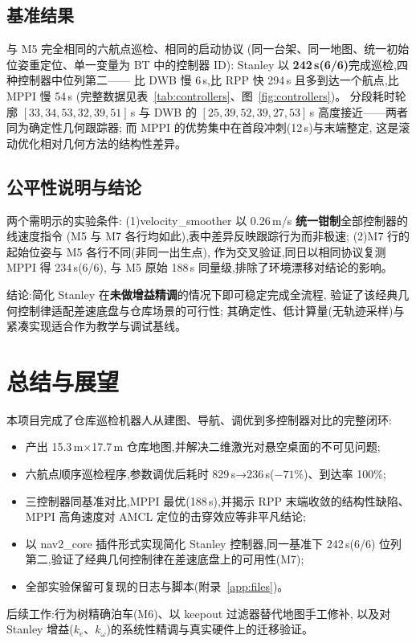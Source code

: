 \documentclass[12pt, a4paper]{ctexart}
\begin{document}
\subsection{基准结果}
与 M5 完全相同的六航点巡检、相同的启动协议
(同一台架、同一地图、统一初始位姿重定位、单一变量为 BT 中的控制器 ID):
Stanley 以 \textbf{242\,s(6/6)}完成巡检,四种控制器中位列第二——
比 DWB 慢 6\,s,比 RPP 快 294\,s 且多到达一个航点,比 MPPI 慢 54\,s
(完整数据见表~\ref{tab:controllers}、图~\ref{fig:controllers})。
分段耗时轮廓 $[33,34,53,32,39,51]$\,s 与 DWB 的 $[25,39,52,39,27,53]$\,s
高度接近——两者同为确定性几何跟踪器;
而 MPPI 的优势集中在首段冲刺(12\,s)与末端整定,
这是滚动优化相对几何方法的结构性差异。

\subsection{公平性说明与结论}
两个需明示的实验条件:
(1)velocity\_smoother 以 0.26\,m/s \textbf{统一钳制}全部控制器的线速度指令
(M5 与 M7 各行均如此),表中差异反映跟踪行为而非极速;
(2)M7 行的起始位姿与 M5 各行不同(非同一出生点),
作为交叉验证,同日以相同协议复测 MPPI 得 234\,s(6/6),
与 M5 原始 188\,s 同量级,排除了环境漂移对结论的影响。

结论:简化 Stanley 在\textbf{未做增益精调}的情况下即可稳定完成全流程,
验证了该经典几何控制律适配差速底盘与仓库场景的可行性;
其确定性、低计算量(无轨迹采样)与紧凑实现适合作为教学与调试基线。

\section{总结与展望}
本项目完成了仓库巡检机器人从建图、导航、调优到多控制器对比的完整闭环:
\begin{itemize}
  \item 产出 15.3\,m$\times$17.7\,m 仓库地图,并解决二维激光对悬空桌面的不可见问题;
  \item 六航点顺序巡检程序,参数调优后耗时 829\,s→236\,s($-71\%$)、到达率 100\%;
  \item 三控制器同基准对比,MPPI 最优(188\,s),并揭示 RPP 末端收敛的结构性缺陷、
        MPPI 高角速度对 AMCL 定位的击穿效应等非平凡结论;
  \item 以 nav2\_core 插件形式实现简化 Stanley 控制器,同一基准下 242\,s(6/6)
        位列第二,验证了经典几何控制律在差速底盘上的可用性(M7);
  \item 全部实验保留可复现的日志与脚本(附录~\ref{app:files})。
\end{itemize}
后续工作:行为树精确泊车(M6)、以 keepout 过滤器替代地图手工修补,
以及对 Stanley 增益($k_e$、$k_\omega$)的系统性精调与真实硬件上的迁移验证。
\end{document}
